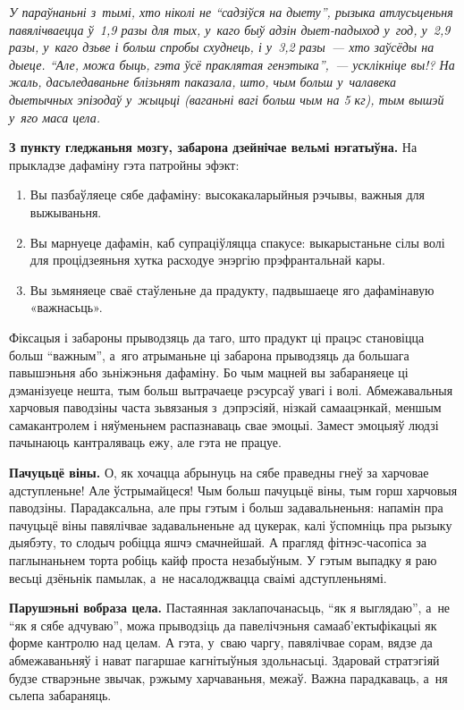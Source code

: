 \emph{У параўнаньні з~тымі, хто ніколі не ``садзіўся на дыету'', рызыка атлусьценьня павялічваецца ў~1,9 разы для тых, у~каго быў адзін дыет-падыход у~год, у~2,9 разы, у~каго дзьве і больш спробы схуднець, і у~3,2 разы~--- хто заўсёды на дыеце. ``Але, можа быць, гэта ўсё праклятая генэтыка'',~--- усклікніце вы!? На жаль, дасьледаваньне блізьнят паказала, што, чым больш у~чалавека дыетычных эпізодаў у~жыцьці (ваганьні вагі больш чым на 5 кг), тым вышэй у~яго маса цела.}

\textbf{З пункту гледжаньня мозгу, забарона дзейнічае вельмі нэгатыўна.} На прыкладзе дафаміну гэта патройны эфэкт: 
\begin{enumerate}
  \item Вы пазбаўляеце сябе дафаміну: высокакаларыйныя рэчывы, важныя для выжываньня. 
  \item Вы марнуеце дафамін, каб супраціўляцца спакусе: выкарыстаньне сілы волі для процідзеяньня хутка расходуе энэргію прэфрантальнай кары. 
  \item Вы зьмяняеце сваё стаўленьне да прадукту, падвышаеце яго дафамінавую «важнасьць».
\end{enumerate}

Фіксацыя і забароны прыводзяць да таго, што прадукт ці працэс становіцца больш ``важным'', а~яго атрыманьне ці забарона прыводзяць да большага павышэньня або зьніжэньня дафаміну. Бо чым мацней вы забараняеце ці дэманізуеце нешта, тым больш вытрачаеце рэсурсаў увагі і волі. Абмежавальныя харчовыя паводзіны часта зьвязаныя з~дэпрэсіяй, нізкай самаацэнкай, меншым самакантролем і няўменьнем распазнаваць свае эмоцыі. Замест эмоцыяў людзі пачынаюць кантраляваць ежу, але гэта не працуе.


\textbf{Пачуцьцё віны.} О, як хочацца абрынуць на сябе праведны гнеў за харчовае адступленьне! Але ўстрымайцеся! Чым больш пачуцьцё віны, тым горш харчовыя паводзіны. Парадаксальна, але пры гэтым і больш задавальненьня: напамін пра пачуцьцё віны павялічвае задавальненьне ад цукерак, калі ўспомніць пра рызыку дыябэту, то слодыч робіцца яшчэ смачнейшай. А прагляд фітнэс-часопіса за паглынаньнем торта робіць кайф проста незабыўным. У гэтым выпадку я раю весьці дзёньнік памылак, а~не насалоджвацца сваімі адступленьнямі.

\textbf{Парушэньні вобраза цела.} Пастаянная заклапочанасьць, ``як я выглядаю'', а~не ``як я сябе адчуваю'', можа прыводзіць да павелічэньня самааб'ектыфікацыі як форме кантролю над целам. А гэта, у~сваю чаргу, павялічвае сорам, вядзе да абмежаваньняў і нават пагаршае кагнітыўныя здольнасьці. Здаровай стратэгіяй будзе стварэньне звычак, рэжыму харчаваньня, межаў. Важна парадкаваць, а~ня сьлепа забараняць.

